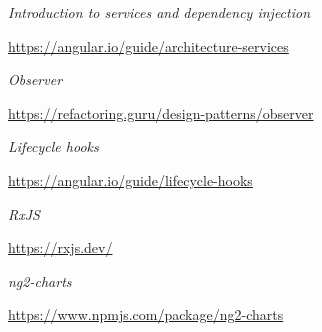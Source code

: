 \documentclass[12pt,a4paper]{report}
\begin{document}
\begin{thebibliography}{9}
  
  \textit{Introduction to services and dependency injection}
  
  \url{https://angular.io/guide/architecture-services}
  
  
  \textit{Observer}
  
  \url{https://refactoring.guru/design-patterns/observer}
  
  
  \textit{Lifecycle hooks}
  
  \url{https://angular.io/guide/lifecycle-hooks}
  
  
  \textit{RxJS}
  
  \url{https://rxjs.dev/}
  
  
  \textit{ng2-charts}
  
  \url{https://www.npmjs.com/package/ng2-charts}


\end{thebibliography}
\end{document}
